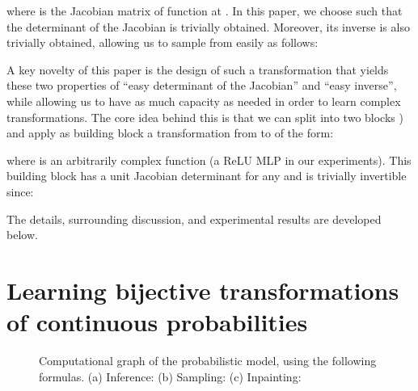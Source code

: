 \documentclass{article}
\begin{document}
where  is the Jacobian matrix of function  at .
In this paper, we choose  such that the determinant of the Jacobian is
trivially obtained. Moreover, its inverse  is also trivially obtained,
allowing us to sample from  easily as follows:

A key novelty of this paper is the design of such a transformation 
that yields these two properties of ``easy determinant of the Jacobian''
and ``easy inverse'', while allowing us to have as much capacity as needed
in order to learn complex transformations. The core idea
behind this is that we can split  into two blocks ) and
apply as building block a transformation from  to 
of the form:

where  is an arbitrarily complex function (a ReLU MLP in our experiments). This building
block has a unit Jacobian determinant for any  and is trivially invertible
since:

The details, surrounding discussion, and experimental results
are developed below.




















\section{Learning bijective transformations of continuous probabilities} 
\begin{figure}
    \centering {}
    \caption{Computational graph of the probabilistic model, using the following formulas.\newline
    (a) Inference: \newline
    (b) Sampling: \newline
    (c) Inpainting: \newline
    }
\end{figure}
\end{document}
